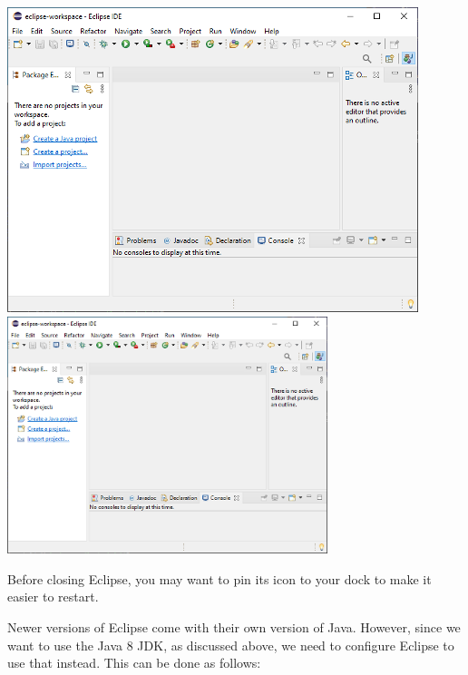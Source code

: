 \begin{center}
\iflatexml
   \includegraphics[]{images/EmptyEclipse}
\else
   \includegraphics[width=0.7\textwidth]{images/EmptyEclipse}
\fi
\end{center}

\ifMacOS
\begin{sideblock}
Before closing Eclipse, you may want to pin its icon to your dock
to make it easier to restart.
\end{sideblock}
\fi

Newer versions of Eclipse come with their own version of
Java. However, since we want to use the Java 8 JDK, as discussed
above, we need to configure Eclipse to use that instead. This can be
done as follows:

